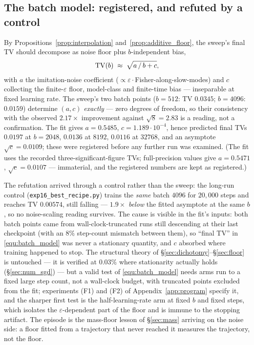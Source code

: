 \subsection{The batch model: registered, and refuted by a control}\label{sec:batch_model}

By Propositions~\ref{prop:interpolation} and~\ref{prop:additive_floor}, the sweep's
final TV should decompose as noise floor plus $b$-independent bias,
\begin{equation}\label{equ:batch_model}
    \mathrm{TV}(b) \;\approx\; \sqrt{a\,/\,b + c},
\end{equation}
with $a$ the imitation-noise coefficient
($\propto\varepsilon\cdot$Fisher-along-slow-modes) and $c$ collecting the
finite-$\varepsilon$ floor, model-class and finite-time bias --- inseparable at fixed
learning rate. The sweep's two batch points ($b=512$: TV $0.0345$; $b=4096$: $0.0159$)
determine $(a,c)$ \emph{exactly} --- zero degrees of freedom, so their consistency with
the observed $2.17\times$ improvement against $\sqrt8=2.83$ is a reading, not a
confirmation. The fit gives $a=0.5485$, $c=1.189\cdot10^{-4}$, hence predicted final TVs
$0.0197$ at $b=2048$, $0.0136$ at $8192$, $0.0116$ at $32768$, and an asymptote
$\sqrt c=0.0109$; these were registered before any further run was examined. (The fit
uses the recorded three-significant-figure TVs; full-precision values give $a=0.5471$,
$\sqrt c=0.0107$ --- immaterial, and the registered numbers are kept as registered.)

The refutation arrived through a control rather than the sweep: the long-run control
(\texttt{exp16\_best\_recipe.py}) trains the \emph{same} batch $4096$ for $20{,}000$
steps and reaches TV $0.00574$, still falling --- $1.9\times$ \emph{below} the fitted
asymptote at the same $b$, so no noise-scaling reading survives. The cause is visible in
the fit's inputs: both batch points came from wall-clock-truncated runs still descending
at their last checkpoint (with an $8\%$ step-count mismatch between them), so ``final
TV'' in \eqref{equ:batch_model} was never a stationary quantity, and $c$ absorbed where
training happened to stop. The structural theory of
\S\ref{sec:dichotomy}--\S\ref{sec:floor} is untouched --- it is verified at $0.03\%$
where stationarity actually holds (\S\ref{sec:num_sgd}) --- but a valid test of
\eqref{equ:batch_model} needs arms run to a fixed large step count, not a wall-clock
budget, with truncated points excluded from the fit; experiments (F1) and (F2) of
Appendix~\ref{app:program} specify it, and the sharper first test is the
half-learning-rate arm at fixed $b$ and fixed steps, which isolates the
$\varepsilon$-dependent part of the floor and is immune to the stopping artifact. The
episode is the mass-floor lesson of \S\ref{sec:mass} arriving on the noise side: a floor
fitted from a trajectory that never reached it measures the trajectory, not the floor.

